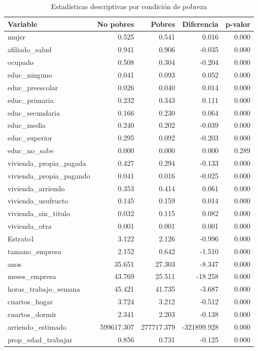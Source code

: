\begin{table}

\caption{\label{tab:descriptivas}Estadísticas descriptivas por condición de pobreza}
\centering
\begin{tabular}[t]{lrrrr}
\toprule
Variable & No pobres & Pobres & Diferencia & p-valor\\
\midrule
mujer & 0.525 & 0.541 & 0.016 & 0.000\\
afiliado\_salud & 0.941 & 0.906 & -0.035 & 0.000\\
ocupado & 0.508 & 0.304 & -0.204 & 0.000\\
educ\_ninguno & 0.041 & 0.093 & 0.052 & 0.000\\
educ\_preescolar & 0.026 & 0.040 & 0.014 & 0.000\\
\addlinespace
educ\_primaria & 0.232 & 0.343 & 0.111 & 0.000\\
educ\_secundaria & 0.166 & 0.230 & 0.064 & 0.000\\
educ\_media & 0.240 & 0.202 & -0.039 & 0.000\\
educ\_superior & 0.295 & 0.092 & -0.203 & 0.000\\
educ\_no\_sabe & 0.000 & 0.000 & 0.000 & 0.289\\
\addlinespace
vivienda\_propia\_pagada & 0.427 & 0.294 & -0.133 & 0.000\\
vivienda\_propia\_pagando & 0.041 & 0.016 & -0.025 & 0.000\\
vivienda\_arriendo & 0.353 & 0.414 & 0.061 & 0.000\\
vivienda\_usufructo & 0.145 & 0.159 & 0.014 & 0.000\\
vivienda\_sin\_titulo & 0.032 & 0.115 & 0.082 & 0.000\\
\addlinespace
vivienda\_otra & 0.001 & 0.001 & 0.001 & 0.000\\
Estrato1 & 3.122 & 2.126 & -0.996 & 0.000\\
tamano\_empresa & 2.152 & 0.642 & -1.510 & 0.000\\
anos & 35.651 & 27.303 & -8.347 & 0.000\\
meses\_empresa & 43.769 & 25.511 & -18.258 & 0.000\\
\addlinespace
horas\_trabajo\_semana & 45.421 & 41.735 & -3.687 & 0.000\\
cuartos\_hogar & 3.724 & 3.212 & -0.512 & 0.000\\
cuartos\_dormir & 2.341 & 2.203 & -0.138 & 0.000\\
arriendo\_estimado & 599617.307 & 277717.379 & -321899.928 & 0.000\\
prop\_edad\_trabajar & 0.856 & 0.731 & -0.125 & 0.000\\
\bottomrule
\end{tabular}
\end{table}
